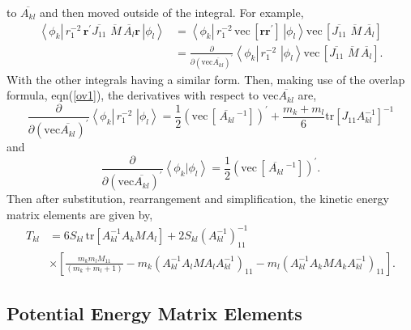 \documentclass[12pt]{article}
\begin{document}
to $\overline{A_{kl}}$ and then moved outside of the
integral\cite{Kinghorn95a}. For example,
\begin{align}
\left\langle \phi_{k}\right|  \,r_{1}^{-2}\,\mathbf{r}^{\prime}\overline
{J_{11}}\,\overline{\,M}\,\overline{A_{l}}\mathbf{r\,}\left|  \phi
_{l}\right\rangle  &  =\left\langle \phi_{k}\right|  \,r_{1}^{-2}%
\,\mathrm{vec}\,\left[  \mathbf{rr}^{\prime}\right]  \mathbf{\,}\left|
\phi_{l}\right\rangle \mathrm{vec}\,\left[  \overline{J_{11}}\,\overline
{\,M}\,\overline{A_{l}}\right]  \\
&  =\frac{\partial}{\partial\left(  \mathrm{vec}\overline{A_{kl}}\right)
^{\prime}}\left\langle \phi_{k}\right|  \,r_{1}^{-2}\,\mathbf{\,}\left|
\phi_{l}\right\rangle \mathrm{vec}\,\left[  \overline{J_{11}}\,\overline
{\,M}\,\overline{A_{l}}\right]  .\nonumber
\end{align}
With the other integrals having a similar form. Then, making use of the
overlap formula, eqn(\ref{ov1}), the derivatives with respect to
$\mathrm{vec}\overline{A_{kl}}$ are,
\begin{equation}
\frac{\partial}{\partial\left(  \mathrm{vec}\overline{A_{kl}}\right)
^{\prime}}\left\langle \phi_{k}\right|  \,r_{1}^{-2}\,\mathbf{\,}\left|
\phi_{l}\right\rangle =\frac{1}{2}\left(  \mathrm{vec}\,\left[  \overline
{\,A_{kl}}\,^{-1}\right]  \right)  ^{\prime}+\frac{m_{k}+m_{l}}{6}%
\mathrm{tr}\left[  J_{11}A_{kl}^{-1}\right]  ^{-1}%
\end{equation}
and
\begin{equation}
\frac{\partial}{\partial\left(  \mathrm{vec}\overline{A_{kl}}\right)
^{\prime}}\left\langle \phi_{k}\right.  |\left.  \phi_{l}\right\rangle
=\frac{1}{2}\left(  \mathrm{vec}\,\left[  \overline{\,A_{kl}}\,^{-1}\right]
\right)  ^{\prime}.
\end{equation}
Then after substitution, rearrangement and simplification, the kinetic energy
matrix elements are given by,
\begin{align}
T_{kl} &  =6S_{kl}\,\mathrm{tr}\left[  A_{kl}^{-1}A_{k}MA_{l}\right]
+2S_{kl}\left(  A_{kl}^{-1}\right)  _{11}^{-1}\label{Tkl}\\
&  \times\left[  \frac{m_{k}m_{l}M_{11}}{\left(  m_{k}+m_{l}+1\right)  }%
-m_{k}\left(  A_{kl}^{-1}A_{l}MA_{l}A_{kl}^{-1}\right)  _{11}-m_{l}\left(
A_{kl}^{-1}A_{k}MA_{k}A_{kl}^{-1}\right)  _{11}\right]  .\nonumber
\end{align}

\subsection{Potential Energy Matrix Elements}
\end{document}
